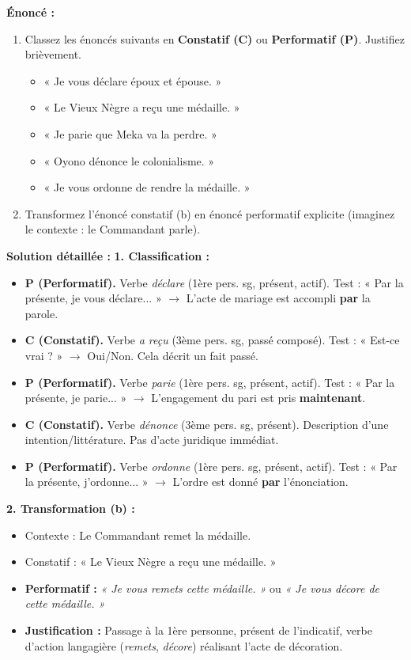 \documentclass[11pt]{article}
\begin{document}
\begin{exoresolu}
\textbf{Énoncé :}
\begin{enumerate}
    \item Classez les énoncés suivants en \textbf{Constatif (C)} ou \textbf{Performatif (P)}. Justifiez brièvement.
    \begin{itemize}
        \item[a)] « Je vous déclare époux et épouse. »
        \item[b)] « Le Vieux Nègre a reçu une médaille. »
        \item[c)] « Je parie que Meka va la perdre. »
        \item[d)] « Oyono dénonce le colonialisme. »
        \item[e)] « Je vous ordonne de rendre la médaille. »
    \end{itemize}
    \item Transformez l'énoncé constatif (b) en énoncé performatif explicite (imaginez le contexte : le Commandant parle).
\end{enumerate}
\tcblower
\textbf{Solution détaillée :}
\textbf{1. Classification :}
\begin{itemize}
    \item[a)] \textbf{P (Performatif).} Verbe \emph{déclare} (1ère pers. sg, présent, actif). Test : « Par la présente, je vous déclare... » $\rightarrow$ L'acte de mariage est accompli \textbf{par} la parole.
    \item[b)] \textbf{C (Constatif).} Verbe \emph{a reçu} (3ème pers. sg, passé composé). Test : « Est-ce vrai ? » $\rightarrow$ Oui/Non. Cela décrit un fait passé.
    \item[c)] \textbf{P (Performatif).} Verbe \emph{parie} (1ère pers. sg, présent, actif). Test : « Par la présente, je parie... » $\rightarrow$ L'engagement du pari est pris \textbf{maintenant}.
    \item[d)] \textbf{C (Constatif).} Verbe \emph{dénonce} (3ème pers. sg, présent). Description d'une intention/littérature. Pas d'acte juridique immédiat.
    \item[e)] \textbf{P (Performatif).} Verbe \emph{ordonne} (1ère pers. sg, présent, actif). Test : « Par la présente, j'ordonne... » $\rightarrow$ L'ordre est donné \textbf{par} l'énonciation.
\end{itemize}
\textbf{2. Transformation (b) :}
\begin{itemize}
    \item Contexte : Le Commandant remet la médaille.
    \item Constatif : « Le Vieux Nègre a reçu une médaille. »
    \item \textbf{Performatif :} \emph{« Je vous remets cette médaille. »} ou \emph{« Je vous décore de cette médaille. »}
    \item \textbf{Justification :} Passage à la 1ère personne, présent de l'indicatif, verbe d'action langagière (\emph{remets}, \emph{décore}) réalisant l'acte de décoration.
\end{itemize}
\end{exoresolu}
\end{document}
